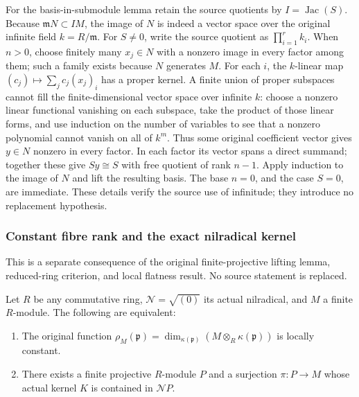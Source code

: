 For the basis-in-submodule lemma retain the source quotients by \(I=\operatorname{Jac}(S)\). Because \(\mathfrak mN\subset IM\), the image of \(N\) is indeed a vector space over the original infinite field \(k=R/\mathfrak m\). For \(S\ne0\), write the source quotient as \(\prod_{i=1}^r k_i\). When \(n>0\), choose finitely many \(x_j\in N\) with a nonzero image in every factor among them; such a family exists because \(N\) generates \(M\). For each \(i\), the \(k\)-linear map \((c_j)\mapsto\sum_j c_j(x_j)_i\) has a proper kernel. A finite union of proper subspaces cannot fill the finite-dimensional vector space over infinite \(k\): choose a nonzero linear functional vanishing on each subspace, take the product of those linear forms, and use induction on the number of variables to see that a nonzero polynomial cannot vanish on all of \(k^m\). Thus some original coefficient vector gives \(y\in N\) nonzero in every factor. In each factor its vector spans a direct summand; together these give \(Sy\cong S\) with free quotient of rank \(n-1\). Apply induction to the image of \(N\) and lift the resulting basis. The base \(n=0\), and the case \(S=0\), are immediate. These details verify the source use of infinitude; they introduce no replacement hypothesis.

\subsubsection{Constant fibre rank and the exact nilradical kernel}\label{algebra-proof-009-constant-fibre-rank-and-the-exact-nilradical-kernel}

This is a separate consequence of the original finite-projective lifting lemma, reduced-ring criterion, and local flatness result. No source statement is replaced.

Let \(R\) be any commutative ring, \(\mathcal N=\sqrt{(0)}\) its actual nilradical, and \(M\) a finite \(R\)-module. The following are equivalent:

\begin{enumerate}
\def\labelenumi{\arabic{enumi}.}
\tightlist
\item
  The original function \(\rho_M(\mathfrak p)=\dim_{\kappa(\mathfrak p)}(M\otimes_R\kappa(\mathfrak p))\) is locally constant.
\item
  There exists a finite projective \(R\)-module \(P\) and a surjection \(\pi:P\to M\) whose actual kernel \(K\) is contained in \(\mathcal NP\).
\end{enumerate}

